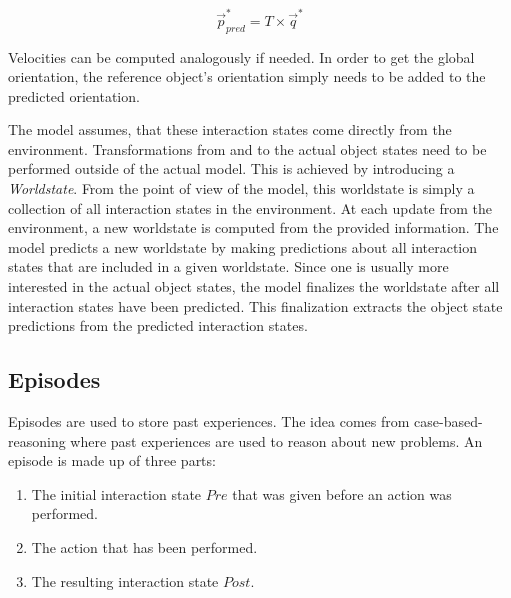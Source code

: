 \begin{equation}
\vec{p}_{pred}^* = T \times \vec{q}^*
\end{equation}

Velocities can be computed analogously if needed.
In order to get the global orientation, the reference object's orientation simply needs to be added to the predicted orientation. 

The model assumes, that these interaction states come directly from the environment. Transformations from and to the actual object states need to be performed outside of the actual model. This is achieved by introducing a \textit{Worldstate}. From the point of view of the model, this worldstate is simply a collection of all interaction states in the environment. At each update from the environment, a new worldstate is computed from the provided information. The model predicts a new worldstate by making predictions about all interaction states that are included in a given worldstate. Since one is usually more interested in the actual object states, the model finalizes the worldstate after all interaction states have been predicted. This finalization extracts the object state predictions from the predicted interaction states. 

\subsection{Episodes \label{sec:episodes}}

Episodes are used to store past experiences. The idea comes from case-based-reasoning \cite{cbr} where past experiences are used to reason about new problems. An episode is made up of three parts: 
\begin{enumerate}
\item The initial interaction state $Pre$ that was given before an action was performed.
\item The action that has been performed.
\item The resulting interaction state $Post$.
\end{enumerate}

